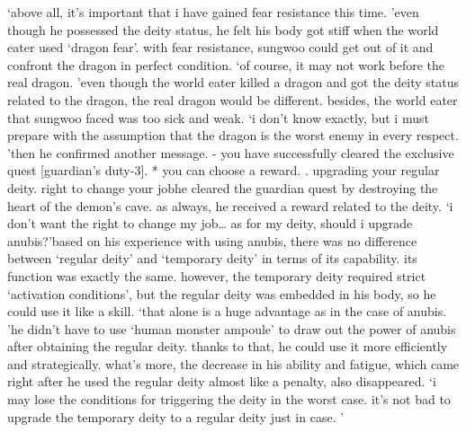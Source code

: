 ‘above all, it’s important that i have gained fear resistance this time.
’even though he possessed the deity status, he felt his body got stiff when the world eater used ‘dragon fear’.
 with fear resistance, sungwoo could get out of it and confront the dragon in perfect condition.
‘of course, it may not work before the real dragon.
’even though the world eater killed a dragon and got the deity status related to the dragon, the real dragon would be different.
 besides, the world eater that sungwoo faced was too sick and weak.
‘i don’t know exactly, but i must prepare with the assumption that the dragon is the worst enemy in every respect.
’then he confirmed another message.
- you have successfully cleared the exclusive quest [guardian’s duty-3].
* you can choose a reward.
.
 upgrading your regular deity.
 right to change your jobhe cleared the guardian quest by destroying the heart of the demon’s cave.
 as always, he received a reward related to the deity.
‘i don’t want the right to change my job… as for my deity, should i upgrade anubis?’based on his experience with using anubis, there was no difference between ‘regular deity’ and ‘temporary deity’ in terms of its capability.
 its function was exactly the same.
however, the temporary deity required strict ‘activation conditions’, but the regular deity was embedded in his body, so he could use it like a skill.
‘that alone is a huge advantage as in the case of anubis.
’he didn’t have to use ‘human monster ampoule’ to draw out the power of anubis after obtaining the regular deity.
 thanks to that, he could use it more efficiently and strategically.
what’s more, the decrease in his ability and fatigue, which came right after he used the regular deity almost like a penalty, also disappeared.
‘i may lose the conditions for triggering the deity in the worst case.
 it’s not bad to upgrade the temporary deity to a regular deity just in case.
’

 